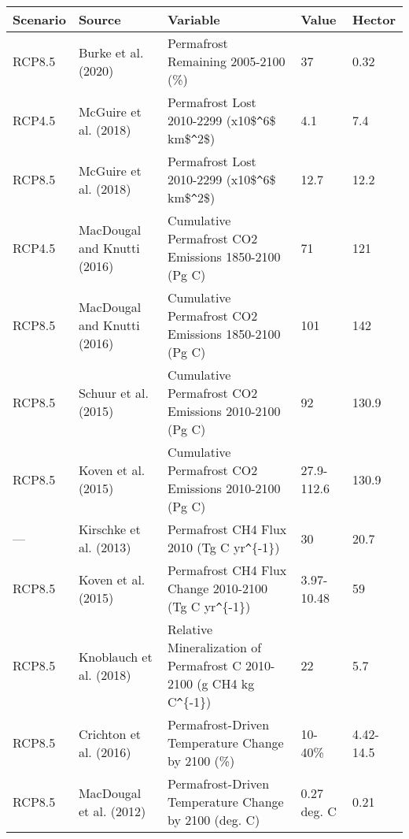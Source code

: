 \begin{tabular}{lllll}
  \toprule
Scenario & Source & Variable & Value & Hector \\ 
  \midrule
RCP8.5 & Burke et al. (2020) & Permafrost Remaining 2005-2100 (\%) & 37 & 0.32 \\ 
  RCP4.5 & McGuire et al. (2018) & Permafrost Lost 2010-2299 (x10\$\verb|^|6\$ km\$\verb|^|2\$) & 4.1 & 7.4 \\ 
  RCP8.5 & McGuire et al. (2018) & Permafrost Lost 2010-2299 (x10\$\verb|^|6\$ km\$\verb|^|2\$) & 12.7 & 12.2 \\ 
  RCP4.5 & MacDougal and Knutti (2016) & Cumulative Permafrost CO2 Emissions 1850-2100 (Pg C) & 71 & 121 \\ 
  RCP8.5 & MacDougal and Knutti (2016) & Cumulative Permafrost CO2 Emissions 1850-2100 (Pg C) & 101 & 142 \\ 
  RCP8.5 & Schuur et al. (2015) & Cumulative Permafrost CO2 Emissions 2010-2100 (Pg C) & 92 & 130.9 \\ 
  RCP8.5 & Koven et al. (2015) & Cumulative Permafrost CO2 Emissions 2010-2100 (Pg C) & 27.9-112.6 & 130.9 \\ 
  --- & Kirschke et al. (2013) & Permafrost CH4 Flux 2010 (Tg C yr\verb|^|\{-1\}) & 30 & 20.7 \\ 
  RCP8.5 & Koven et al. (2015) & Permafrost CH4 Flux Change 2010-2100 (Tg C yr\verb|^|\{-1\}) & 3.97-10.48 & 59 \\ 
  RCP8.5 & Knoblauch et al. (2018) & Relative Mineralization of Permafrost C 2010-2100 (g CH4 kg C\verb|^|\{-1\}) & 22 & 5.7 \\ 
  RCP8.5 & Crichton et al. (2016) & Permafrost-Driven Temperature Change by 2100 (\%) & 10-40\% & 4.42-14.5 \\ 
  RCP8.5 & MacDougal et al. (2012) & Permafrost-Driven Temperature Change by 2100 (deg. C) & 0.27 deg. C & 0.21 \\ 
   \bottomrule
\end{tabular}
